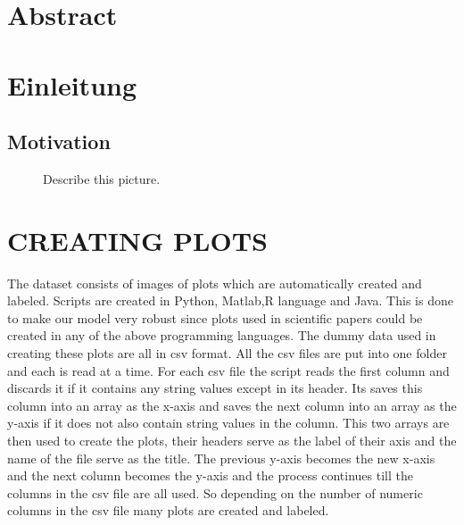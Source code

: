 \documentclass[12pt, a4paper,oneside]{report}
\begin{document}


\setcounter{tocdepth}{10}
\tableofcontents






\listoffigures
\listoftables

\titleformat{\chapter}{\LARGE\bfseries}{\thechapter}{1em}{}



\chapter*{Abstract}


\newpage
\chapter{Einleitung}

\section{Motivation}

\begin{figure}[!ht]
	\centering
	\caption{Describe this picture.}
	\label{fig:1}
\end{figure}


\chapter{CREATING PLOTS}
The dataset consists of images of plots which are automatically created and labeled. Scripts are created in Python, Matlab,R language and Java. This is done to make our model very robust since plots used in scientific papers could be created in any of the above programming languages. The dummy data used in creating these plots are all in csv format. All the csv files are put into one folder and each is read at a time. For each csv file the script reads the first column and discards it if it contains any string values except in its header. Its saves this column into an array as the x-axis and saves the next column into an array as the y-axis if it does not also contain string values in the column. This two arrays are then used to 
create the plots, their headers serve as the label of their axis and the name of the file serve as the title. The previous
y-axis becomes the new x-axis and the next column becomes the y-axis and the process continues till the columns in the csv file are all used. So depending on the number of numeric columns in the csv file many plots are created and labeled.
\end{document}

